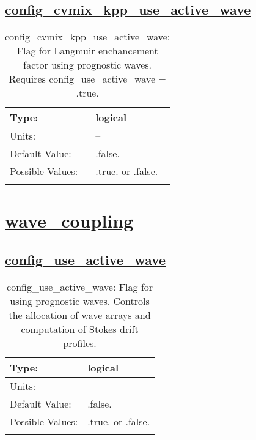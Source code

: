 \subsection[config\_cvmix\_kpp\_use\_active\_wave]{\hyperref[sec:nm_tab_cvmix]{config\_cvmix\_kpp\_use\_active\_wave}}
\label{subsec:nm_sec_config_cvmix_kpp_use_active_wave}
\begin{center}
\begin{longtable}{| p{2.0in} || p{4.0in} |}
    \hline
    Type: & logical \\
    \hline
    Units: & -- \\
    \hline
    Default Value: & .false. \\
    \hline
    Possible Values: & .true. or .false. \\
    \hline
    \caption{config\_cvmix\_kpp\_use\_active\_wave: Flag for Langmuir enchancement factor using prognostic waves. Requires config\_use\_active\_wave = .true.}
\end{longtable}
\end{center}
\section[wave\_coupling]{\hyperref[sec:nm_tab_wave_coupling]{wave\_coupling}}
\label{sec:nm_sec_wave_coupling}
\subsection[config\_use\_active\_wave]{\hyperref[sec:nm_tab_wave_coupling]{config\_use\_active\_wave}}
\label{subsec:nm_sec_config_use_active_wave}
\begin{center}
\begin{longtable}{| p{2.0in} || p{4.0in} |}
    \hline
    Type: & logical \\
    \hline
    Units: & -- \\
    \hline
    Default Value: & .false. \\
    \hline
    Possible Values: & .true. or .false. \\
    \hline
    \caption{config\_use\_active\_wave: Flag for using prognostic waves. Controls the allocation of wave arrays and computation of Stokes drift profiles.}
\end{longtable}
\end{center}
